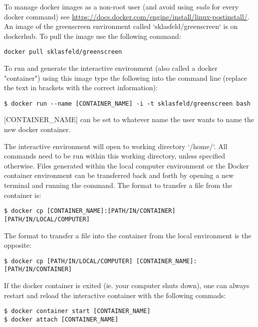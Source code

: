 \documentclass{article}
\begin{document}
\begin{sloppypar}
To manage docker images as a non-root user (and avoid using \emph{sudo} for every docker command) see \url{https://docs.docker.com/engine/install/linux-postinstall/}. An image of the greenscreen environment called `sklasfeld/greenscreen` is on dockerhub. To pull the image use the following command:

\begin{verbatim}
docker pull sklasfeld/greenscreen
\end{verbatim}

To run and generate the interactive environment (also called a docker "container") using this image type the following into the command line (replace the text in brackets with the correct information):

\begin{verbatim}
$ docker run --name [CONTAINER_NAME] -i -t sklasfeld/greenscreen bash
\end{verbatim}

[CONTAINER\_NAME] can be set to whatever name the user wants to name the new docker container.

The interactive environment will open to working directory `/home/`. All commands need to be run within this working directory, unless specified otherwise. Files generated within the local computer environment or the Docker container environment can be transferred back and forth by opening a new terminal and running the  command. The format to transfer a file from the container is:

\begin{verbatim}
$ docker cp [CONTAINER_NAME]:[PATH/IN/CONTAINER] [PATH/IN/LOCAL/COMPUTER]
\end{verbatim}

The format to transfer a file into the container from the local environment is the opposite:

\begin{verbatim}
$ docker cp [PATH/IN/LOCAL/COMPUTER] [CONTAINER_NAME]:[PATH/IN/CONTAINER] 
\end{verbatim}

If the docker container is exited (ie. your computer shuts down), one can always restart and reload the interactive container with the following commads:

\begin{verbatim}
$ docker container start [CONTAINER_NAME]
$ docker attach [CONTAINER_NAME] 
\end{verbatim}


\end{sloppypar}
\end{document}

